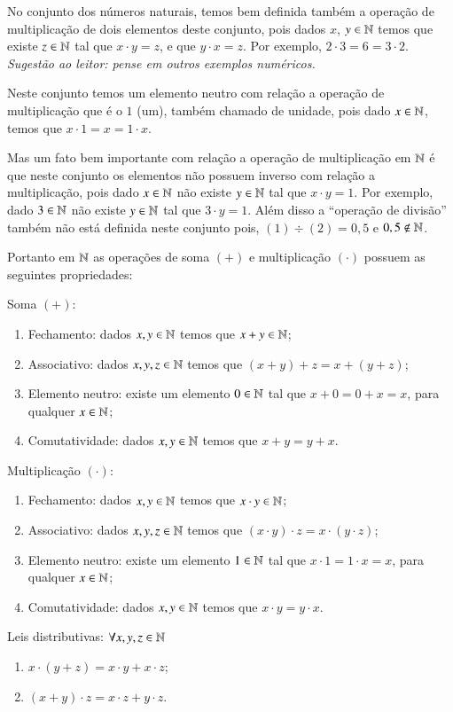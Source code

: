  No conjunto dos números naturais, temos bem definida também a operação de multiplicação de dois elementos deste conjunto, pois dados $x$, $y \in \mathbb{N}$ temos que existe $z \in \mathbb{N}$ tal que $x \cdot y=z$, e que $y \cdot x=z$. Por exemplo, $2 \cdot 3=6=3 \cdot2$. \emph{Sugestão ao leitor: pense em outros exemplos numéricos.}

 Neste conjunto temos um elemento neutro com relação a operação de multiplicação que é o $1$ (um), também chamado de unidade, pois dado $x \in \mathbb{N}$, temos que $x \cdot 1= x= 1 \cdot x$.

 Mas um fato bem importante com relação a operação de multiplicação em $\mathbb{N}$ é que neste conjunto os elementos não possuem inverso com relação a multiplicação, pois dado $x \in \mathbb{N}$ não existe $y \in \mathbb{N}$ tal que $x \cdot y= 1$. Por exemplo, dado $3 \in \mathbb{N}$ não existe $y \in \mathbb{N}$ tal que $3 \cdot y= 1$. Além disso a ``operação de divisão'' também não está definida neste conjunto pois, $(1)\div (2)= 0,5$ e $0,5 \notin \mathbb{N}$.

  \vskip0.3cm

 Portanto em $\mathbb{N}$ as operações de soma $(+)$ e multiplicação $(\cdot)$ possuem as seguintes propriedades:

 Soma $(+)$:
 \begin{enumerate}[1)]
 \item Fechamento: dados $x, y \in \mathbb{N}$ temos que $x+y \in \mathbb{N}$;
 \item Associativo: dados $x, y, z \in \mathbb{N}$ temos que $(x+y)+z= x+(y+z)$;
 \item Elemento neutro: existe um elemento $0 \in \mathbb{N}$ tal que $x+0=0+x=x$, para qualquer $x \in \mathbb{N}$;
 \item Comutatividade: dados $x, y \in \mathbb{N}$ temos que $x+y= y+x$.
 \end{enumerate}

  Multiplicação $(\cdot)$:
 \begin{enumerate}[1)]
 \item Fechamento: dados $x, y \in \mathbb{N}$ temos que $x \cdot y \in \mathbb{N}$;
 \item Associativo: dados $x, y, z \in \mathbb{N}$ temos que $(x \cdot y) \cdot z= x \cdot (y \cdot z)$;
 \item Elemento neutro: existe um elemento $1 \in \mathbb{N}$ tal que $x \cdot 1= 1 \cdot x= x$, para qualquer $x \in \mathbb{N}$;
 \item Comutatividade: dados $x, y \in \mathbb{N}$ temos que $x \cdot y= y \cdot x$.
 \end{enumerate}

 Leis distributivas: $\forall x, y, z \in \mathbb{N}$
 \begin{enumerate}[1)]
 \item $x \cdot (y + z)= x \cdot y + x \cdot z$;
 \item $(x + y) \cdot z= x \cdot z + y \cdot z$.
 \end{enumerate}

